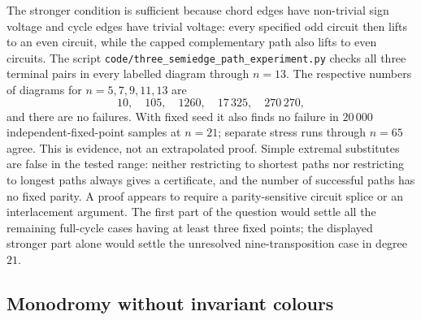 \documentclass[11pt,a4paper]{article}
\theoremstyle{definition}
\theoremstyle{remark}
\begin{document}
The stronger condition is sufficient because chord edges have non-trivial sign voltage and cycle edges have trivial voltage: every specified odd circuit then lifts to an even circuit, while the capped complementary path also lifts to even circuits.  The script \nolinkurl{code/three_semiedge_path_experiment.py} checks all three terminal pairs in every labelled diagram through $n=13$.  The respective numbers of diagrams for $n=5,7,9,11,13$ are
\[
 10,\quad105,\quad1260,\quad17\,325,\quad270\,270,
\]
and there are no failures.  With fixed seed it also finds no failure in $20\,000$ independent-fixed-point samples at $n=21$; separate stress runs through $n=65$ agree.  This is evidence, not an extrapolated proof.  Simple extremal substitutes are false in the tested range: neither restricting to shortest paths nor restricting to longest paths always gives a certificate, and the number of successful paths has no fixed parity.  A proof appears to require a parity-sensitive circuit splice or an interlacement argument.  The first part of the question would settle all the remaining full-cycle cases having at least three fixed points; the displayed stronger part alone would settle the unresolved nine-transposition case in degree $21$.

\subsection{Monodromy without invariant colours}\label{sec:matching-monodromy}
\end{document}
